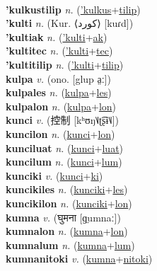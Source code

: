  \label{'kulkustec} \\
\textbf{'kulkustilip} \textit{n.} (\hyperref['kulkus]{'kulkus}+\hyperref[tilip]{tilip})
 \label{'kulkustilip} \\
\textbf{'kulti} \textit{n.} (Kur. ⟨کورد‎⟩ [kuɾd])
 \label{'kulti} \\
\textbf{'kultiak} \textit{n.} (\hyperref['kulti]{'kulti}+\hyperref[ak]{ak})
 \label{'kultiak} \\
\textbf{'kultitec} \textit{n.} (\hyperref['kulti]{'kulti}+\hyperref[tec]{tec})
 \label{'kultitec} \\
\textbf{'kultitilip} \textit{n.} (\hyperref['kulti]{'kulti}+\hyperref[tilip]{tilip})
 \label{'kultitilip} \\
\textbf{kulpa} \textit{v.} (ono. [glup a̤ː])
 \label{kulpa} \\
\textbf{kulpales} \textit{n.} (\hyperref[kulpa]{kulpa}+\hyperref[les]{les})
 \label{kulpales} \\
\textbf{kulpalon} \textit{n.} (\hyperref[kulpa]{kulpa}+\hyperref[lon]{lon})
 \label{kulpalon} \\
\textbf{kunci} \textit{v.} ({\chinese{}控制} [kʰʊŋ˥˩ʈ͡ʂɨ˥˩])
 \label{kunci} \\
\textbf{kuncilon} \textit{n.} (\hyperref[kunci]{kunci}+\hyperref[lon]{lon})
 \label{kuncilon} \\
\textbf{kunciluat} \textit{n.} (\hyperref[kunci]{kunci}+\hyperref[luat]{luat})
 \label{kunciluat} \\
\textbf{kuncilum} \textit{n.} (\hyperref[kunci]{kunci}+\hyperref[lum]{lum})
 \label{kuncilum} \\
\textbf{kunciki} \textit{v.} (\hyperref[kunci]{kunci}+\hyperref[ki]{ki})
 \label{kunciki} \\
\textbf{kuncikiles} \textit{n.} (\hyperref[kunciki]{kunciki}+\hyperref[les]{les})
 \label{kuncikiles} \\
\textbf{kuncikilon} \textit{n.} (\hyperref[kunciki]{kunciki}+\hyperref[lon]{lon})
 \label{kuncikilon} \\
\textbf{kumna} \textit{v.} ({\devanagari{}घुमना} [ɡ̤umnaː])
 \label{kumna} \\
\textbf{kumnalon} \textit{n.} (\hyperref[kumna]{kumna}+\hyperref[lon]{lon})
 \label{kumnalon} \\
\textbf{kumnalum} \textit{n.} (\hyperref[kumna]{kumna}+\hyperref[lum]{lum})
 \label{kumnalum} \\
\textbf{kumnanitoki} \textit{v.} (\hyperref[kumna]{kumna}+\hyperref[nitoki]{nitoki})
 \label{kumnanitoki} \\
